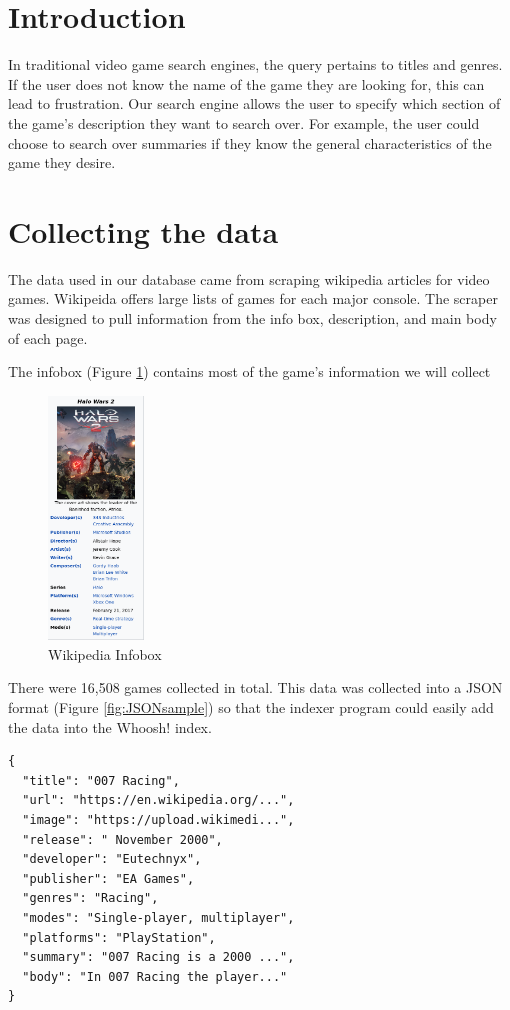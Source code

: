 \section{Introduction}

In traditional video game search engines, the query pertains to titles and genres. If the user does not know the name of the game they are looking for, this can lead to frustration. Our search engine allows the user to specify which section of the game's description they want to search over. For example, the user could choose to search over summaries if they know the general characteristics of the game they desire.

\section{Collecting the data}
The data used in our database came from scraping wikipedia articles for video games. Wikipeida offers large lists of games for each major console. The scraper was designed to pull information from the info box, description, and main body of each page.



The infobox (Figure \ref{fig:infobox}) contains most of the game's information we will collect

\begin{figure}[h!]
\includegraphics[width=1in]{infobox}
\caption{Wikipedia Infobox}
\label{fig:infobox}
\end{figure}

There were 16,508 games collected in total. This data was collected into a JSON format (Figure \ref{fig:JSONsample}) so that the indexer program could easily add the data into the Whoosh! index. 

\begin{minipage}[H]{0.4\textwidth}
\begin{verbatim}
{
  "title": "007 Racing",                
  "url": "https://en.wikipedia.org/...",
  "image": "https://upload.wikimedi...",
  "release": " November 2000",          
  "developer": "Eutechnyx",             
  "publisher": "EA Games",              
  "genres": "Racing",                   
  "modes": "Single-player, multiplayer",
  "platforms": "PlayStation",           
  "summary": "007 Racing is a 2000 ...",
  "body": "In 007 Racing the player..."
}
\end{verbatim}
\label{fig:JSONsample}
\end{minipage}

